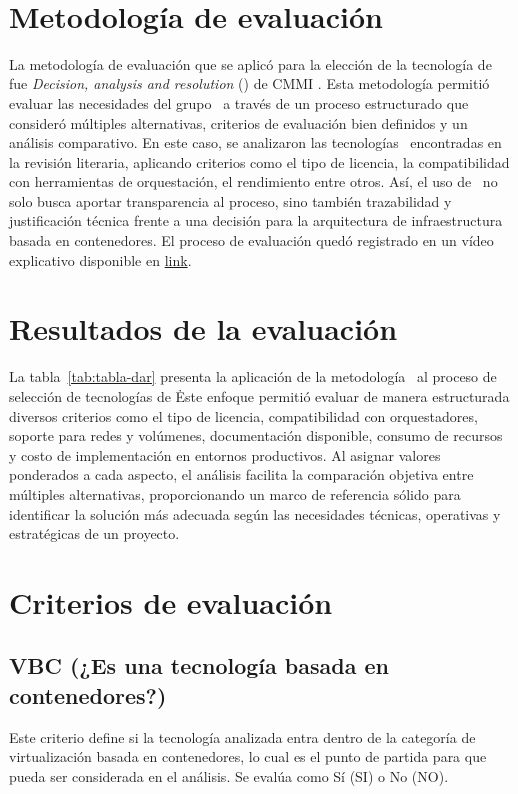 \label{cap:dar}
\mbox{}\\
\section{Metodología de evaluación}
\noindent
La metodología de evaluación que se aplicó para la elección de la tecnología de \VBC fue \textit{Decision, analysis and resolution} (\DAR) de CMMI \citep{CMMIInstitute2010}. Esta metodología permitió evaluar las necesidades del grupo \GRID\ a través de un proceso estructurado que consideró múltiples alternativas, criterios de evaluación bien definidos y un análisis comparativo. En este caso, se analizaron las tecnologías \VBC\ encontradas en la revisión literaria, aplicando criterios como el tipo de licencia, la compatibilidad con herramientas de orquestación, el rendimiento entre otros. Así, el uso de \DAR\ no solo busca aportar transparencia al proceso, sino también trazabilidad y justificación técnica frente a una decisión para la arquitectura de infraestructura basada en contenedores.
El proceso de evaluación quedó registrado en un vídeo explicativo disponible en \href{https://youtu.be/xOmuQs2RX2c}{link}.

\section{Resultados de la evaluación}
\noindent
La tabla~\ref{tab:tabla-dar} presenta la aplicación de la metodología \DAR\ al proceso de selección de tecnologías de \VBC\. Este enfoque permitió evaluar de manera estructurada diversos criterios como el tipo de licencia, compatibilidad con orquestadores, soporte para redes y volúmenes, documentación disponible, consumo de recursos y costo de implementación en entornos productivos. Al asignar valores ponderados a cada aspecto, el análisis facilita la comparación objetiva entre múltiples alternativas, proporcionando un marco de referencia sólido para identificar la solución más adecuada según las necesidades técnicas, operativas y estratégicas de un proyecto.


\section{Criterios de evaluación}

\subsection{VBC (¿Es una tecnología basada en contenedores?)}
\noindent
Este criterio define si la tecnología analizada entra dentro de la categoría de virtualización basada en contenedores, lo cual es el punto de partida para que pueda ser considerada en el análisis. Se evalúa como Sí (SI) o No (NO).

